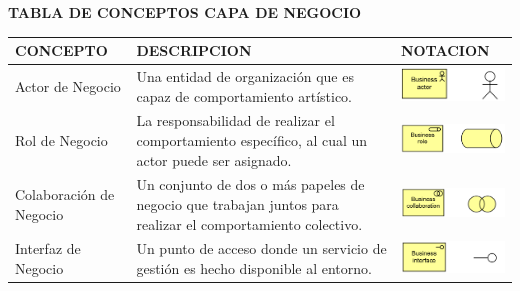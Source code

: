 \begin{table}[H]
	\centering\textbf{TABLA DE CONCEPTOS CAPA DE NEGOCIO}

	\centering
	\begin{tabular}{| m{4cm} | m{4cm} | m{4cm} | }
		\hline
		\centering\vspace{1.52mm}CONCEPTO & \centering\vspace{1.52mm}DESCRIPCION & \vspace{1.52mm}NOTACION \\
		\hline
		\centering\vspace{1.52mm}Actor de Negocio & \vspace{1.52mm} Una entidad de organización que es capaz de comportamiento artístico. & \vspace{1.52mm}\includegraphics[width=40mm]{arquitectura/imagenes/11} \\
		\hline
		\centering\vspace{1.52mm}Rol de Negocio & \vspace{1.52mm} La responsabilidad de realizar el comportamiento específico, al cual un actor puede ser asignado.  & \vspace{1.52mm}\includegraphics[width=40mm]{arquitectura/imagenes/12} \\
		\hline
		\centering\vspace{1.52mm}Colaboración de Negocio & \vspace{1.52mm}Un conjunto de dos o más papeles de negocio que trabajan juntos para realizar el comportamiento colectivo.   & \vspace{1.52mm}\includegraphics[width=40mm]{arquitectura/imagenes/13} \\
		\hline
		\centering\vspace{1.52mm}Interfaz de Negocio & \vspace{1.52mm}Un punto de acceso donde un servicio de gestión es hecho disponible al entorno.   & \vspace{1.52mm}\includegraphics[width=40mm]{arquitectura/imagenes/14} \\

\end{tabular}
\end{table}
